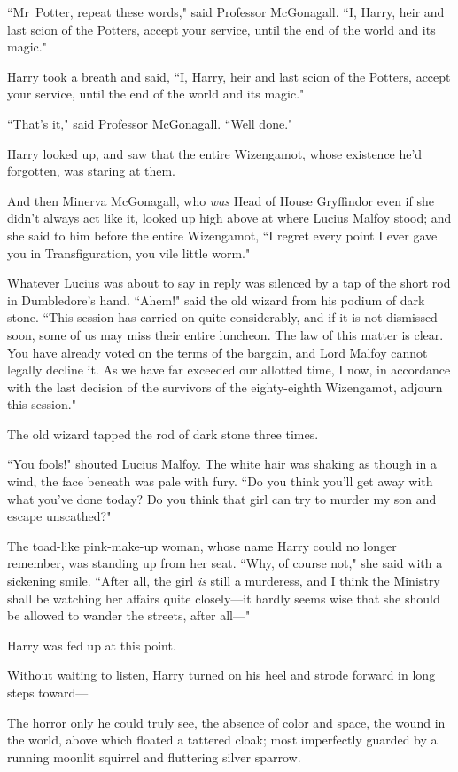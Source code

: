 ``Mr~Potter, repeat these words," said Professor McGonagall. ``I, Harry, heir and last scion of the Potters, accept your service, until the end of the world and its magic."

Harry took a breath and said, ``I, Harry, heir and last scion of the Potters, accept your service, until the end of the world and its magic."

``That's it," said Professor McGonagall. ``Well done."

Harry looked up, and saw that the entire Wizengamot, whose existence he'd forgotten, was staring at them.

And then Minerva McGonagall, who \emph{was} Head of House Gryffindor even if she didn't always act like it, looked up high above at where Lucius Malfoy stood; and she said to him before the entire Wizengamot, ``I regret every point I ever gave you in Transfiguration, you vile little worm."

Whatever Lucius was about to say in reply was silenced by a tap of the short rod in Dumbledore's hand. ``Ahem!" said the old wizard from his podium of dark stone. ``This session has carried on quite considerably, and if it is not dismissed soon, some of us may miss their entire luncheon. The law of this matter is clear. You have already voted on the terms of the bargain, and Lord Malfoy cannot legally decline it. As we have far exceeded our allotted time, I now, in accordance with the last decision of the survivors of the eighty-eighth Wizengamot, adjourn this session."

The old wizard tapped the rod of dark stone three times.

``You fools!" shouted Lucius Malfoy. The white hair was shaking as though in a wind, the face beneath was pale with fury. ``Do you think you'll get away with what you've done today? Do you think that girl can try to murder my son and escape unscathed?"

The toad-like pink-make-up woman, whose name Harry could no longer remember, was standing up from her seat. ``Why, of course not," she said with a sickening smile. ``After all, the girl \emph{is} still a murderess, and I think the Ministry shall be watching her affairs quite closely—it hardly seems wise that she should be allowed to wander the streets, after all—"

Harry was fed up at this point.

Without waiting to listen, Harry turned on his heel and strode forward in long steps toward—

The horror only he could truly see, the absence of color and space, the wound in the world, above which floated a tattered cloak; most imperfectly guarded by a running moonlit squirrel and fluttering silver sparrow.

